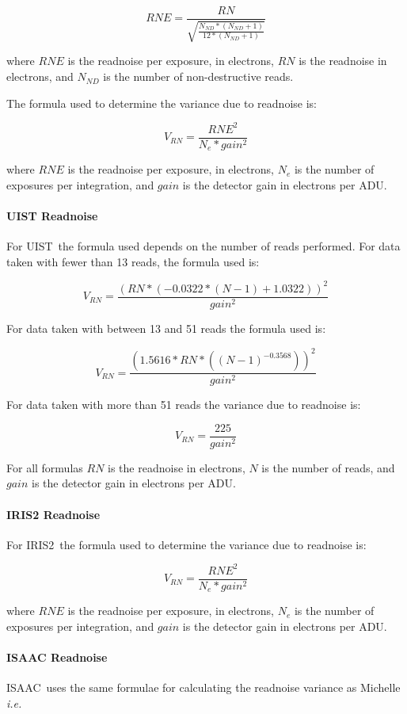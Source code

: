 \documentclass[twoside,11pt]{article}
\newcommand{\htmladdnormallink}[2]{#1}
\renewcommand{\_}{\texttt{\symbol{95}}}
\newcommand{\IRIS}{\htmladdnormallink{IRIS2}{http://www.aao.gov.au/iris2/}}
\newcommand{\ISAAC}{\htmladdnormallink{ISAAC}{http://www.eso.org/instruments/isaac/}}
\newcommand{\Michelle}{\htmladdnormallink{Michelle}{http://www.jach.hawaii.edu/JACpublic/UKIRT/instruments/michelle/michelle.html}}
\newcommand{\UIST}{\htmladdnormallink{UIST}{http://www.jach.hawaii.edu/JACpublic/UKIRT/instruments/uist/uist.html}}
\begin{document}
\[   RNE = \frac{RN}{\sqrt{\frac{N_{ND} * ( N_{ND} + 1 )}{12 * ( N_{ND} + 1 )}}} \]

where $RNE$ is the readnoise per exposure, in electrons, $RN$ is the
readnoise in electrons, and $N_{ND}$ is the number of non-destructive reads.

The formula used to determine the variance due to readnoise is:

\[   V_{RN} = \frac{RNE^{2}}{N_e * gain^{2}} \]

where $RNE$ is the readnoise per exposure, in electrons, $N_e$ is the number
of exposures per integration, and $gain$ is the detector gain in electrons
per ADU.

\paragraph{UIST Readnoise}

For \UIST\ the formula used depends on the number of reads performed.
For data taken with fewer than 13 reads, the formula used is:

\[   V_{RN} = \frac{( RN * ( -0.0322 * ( N - 1 ) + 1.0322 ) )^{2}}{gain^{2}} \]

For data taken with between 13 and 51 reads the formula used is:

\[   V_{RN} = \frac{( 1.5616 * RN * ( ( N - 1 )^{-0.3568} ) )^{2}}{gain^{2}} \]

For data taken with more than 51 reads the variance due to readnoise
is:

\[   V_{RN} = \frac{225}{gain^{2}} \]

For all formulas $RN$ is the readnoise in electrons, $N$ is the number
of reads, and $gain$ is the detector gain in electrons per ADU.

\paragraph{IRIS2 Readnoise} For \IRIS\ the formula used to determine
the variance due to readnoise is:

\[   V_{RN} = \frac{RNE^{2}}{N_e * gain^{2}} \]

where $RNE$ is the readnoise per exposure, in electrons, $N_e$ is the
number of exposures per integration, and $gain$ is the detector gain
in electrons per ADU.

\paragraph{ISAAC Readnoise} \ISAAC\ uses the same formulae for calculating
the readnoise variance as \Michelle\, {\em i.e.}
\end{document}
